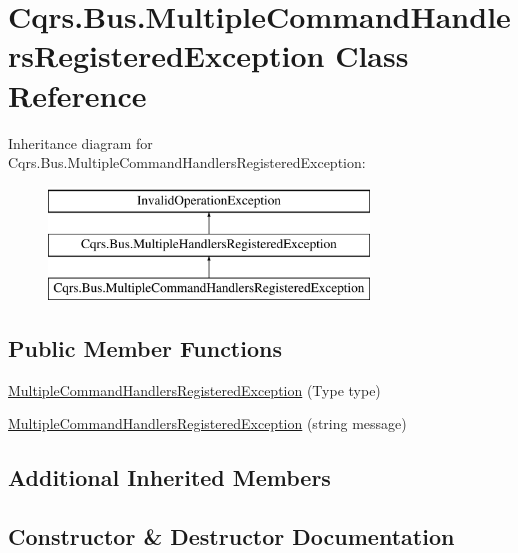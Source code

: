 \hypertarget{classCqrs_1_1Bus_1_1MultipleCommandHandlersRegisteredException}{}\section{Cqrs.\+Bus.\+Multiple\+Command\+Handlers\+Registered\+Exception Class Reference}
\label{classCqrs_1_1Bus_1_1MultipleCommandHandlersRegisteredException}
Inheritance diagram for Cqrs.\+Bus.\+Multiple\+Command\+Handlers\+Registered\+Exception\+:\begin{figure}[H]
\begin{center}
\leavevmode
\includegraphics[height=3.000000cm]{classCqrs_1_1Bus_1_1MultipleCommandHandlersRegisteredException}
\end{center}
\end{figure}
\subsection*{Public Member Functions}
\begin{DoxyCompactItemize}
\item 
\hyperlink{classCqrs_1_1Bus_1_1MultipleCommandHandlersRegisteredException_ab96d6d42b3697336f1a8c545128d263f}{Multiple\+Command\+Handlers\+Registered\+Exception} (Type type)
\item 
\hyperlink{classCqrs_1_1Bus_1_1MultipleCommandHandlersRegisteredException_ab3bf3a31e91d75d78788cd414d054e56}{Multiple\+Command\+Handlers\+Registered\+Exception} (string message)
\end{DoxyCompactItemize}
\subsection*{Additional Inherited Members}


\subsection{Constructor \& Destructor Documentation}
\mbox{\label{classCqrs_1_1Bus_1_1MultipleCommandHandlersRegisteredException_ab96d6d42b3697336f1a8c545128d263f}} 
